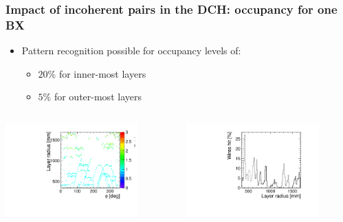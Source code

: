 \documentclass[aspectratio=169, hyperref={colorlinks=true,pdfpagelabels=false,linkcolor=black}, xcolor=dvipsnames,10pt]{beamer}
\begin{document}
\begin{frame}
	\frametitle{Impact of incoherent pairs in the DCH: occupancy
          for one BX}

        \begin{itemize}
        \item Pattern recognition possible for occupancy levels of:
          \begin{itemize}
          \item $20\%$ for inner-most layers
          \item $5\%$ for outer-most layers
          \end{itemize}
        \end{itemize}

	\vspace{-0.1cm}
	\begin{columns}[t]
	\centering
	\includegraphics[width=0.8\textwidth]{../figures/layerR_vs_phi.pdf}


	\centering
	\includegraphics[width=0.8\textwidth]{../figures/layerR_vs_wires_percent.pdf}	
	\end{columns}


\end{frame}
\end{document}

